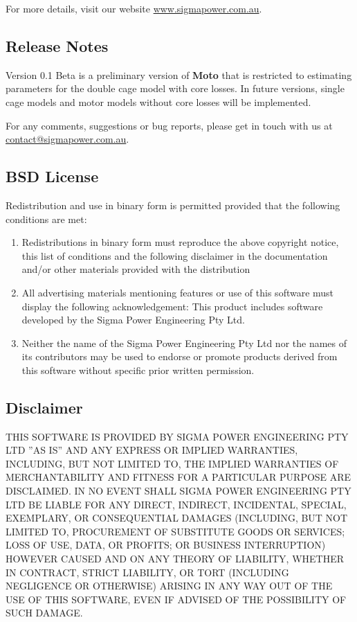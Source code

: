 \documentclass{article}
\begin{document}
For more details, visit our website \href{http://www.sigmapower.com.au}{www.sigmapower.com.au}.

\subsection{Release Notes}
Version 0.1 Beta is a preliminary version of \textbf{Moto} that is restricted to estimating parameters for the double cage model with core losses. In future versions, single cage models and motor models without core losses will be implemented.

For any comments, suggestions or bug reports, please get in touch with us at \href{mailto:contact@sigmapower.com.au}{contact@sigmapower.com.au}.

\subsection{BSD License}
Redistribution and use in  binary form is permitted provided that the following conditions are met:

\begin{enumerate}
\item Redistributions in binary form must reproduce the above copyright notice, this list of conditions and the following disclaimer in the documentation and/or other materials provided with the distribution
\item All advertising materials mentioning features or use of this software must display the following acknowledgement: This product includes software developed by the Sigma Power Engineering Pty Ltd.
\item Neither the name of the Sigma Power Engineering Pty Ltd nor the names of its contributors may be used to endorse or promote products derived from this software without specific prior written permission.
\end{enumerate}

\subsection{Disclaimer}

THIS SOFTWARE IS PROVIDED BY SIGMA POWER ENGINEERING PTY LTD ''AS IS'' AND ANY
EXPRESS OR IMPLIED WARRANTIES, INCLUDING, BUT NOT LIMITED TO, THE IMPLIED
WARRANTIES OF MERCHANTABILITY AND FITNESS FOR A PARTICULAR PURPOSE ARE
DISCLAIMED. IN NO EVENT SHALL SIGMA POWER ENGINEERING PTY LTD BE LIABLE FOR ANY
DIRECT, INDIRECT, INCIDENTAL, SPECIAL, EXEMPLARY, OR CONSEQUENTIAL DAMAGES
(INCLUDING, BUT NOT LIMITED TO, PROCUREMENT OF SUBSTITUTE GOODS OR SERVICES;
LOSS OF USE, DATA, OR PROFITS; OR BUSINESS INTERRUPTION) HOWEVER CAUSED AND
ON ANY THEORY OF LIABILITY, WHETHER IN CONTRACT, STRICT LIABILITY, OR TORT
(INCLUDING NEGLIGENCE OR OTHERWISE) ARISING IN ANY WAY OUT OF THE USE OF THIS
SOFTWARE, EVEN IF ADVISED OF THE POSSIBILITY OF SUCH DAMAGE.
\end{document}
